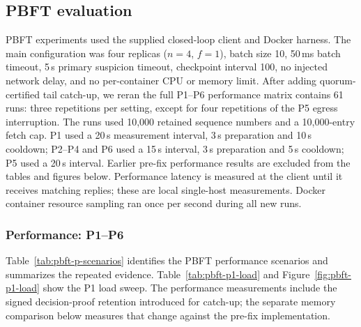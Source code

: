 \documentclass[sigconf,a4paper]{acmart}
\begin{document}
    \subsection{PBFT evaluation}
    \label{subsec:eval-pbft}

    PBFT experiments used the supplied closed-loop client and Docker harness.
    The main configuration was four replicas ($n=4$, $f=1$), batch size 10,
    50\,ms batch timeout, 5\,s primary suspicion timeout, checkpoint interval
    100, no injected network delay, and no per-container CPU or memory limit.
    After adding quorum-certified tail catch-up, we reran the full P1--P6
    performance matrix contains 61 runs: three repetitions per setting,
    except for four repetitions of the P5 egress interruption. The runs used
    10,000 retained sequence numbers and a 10,000-entry fetch cap. P1 used a
    20\,s measurement interval, 3\,s preparation and 10\,s cooldown; P2--P4
    and P6 used a 15\,s interval, 3\,s preparation and 5\,s cooldown; P5 used
    a 20\,s interval. Earlier pre-fix performance results are excluded from
    the tables and figures below. Performance latency is measured at the client
    until it receives matching replies; these are local single-host
    measurements. Docker container resource sampling ran once per second
    during all new runs.

    \subsubsection{Performance: P1--P6}

    Table~\ref{tab:pbft-p-scenarios} identifies the PBFT performance scenarios
    and summarizes the repeated evidence. Table~\ref{tab:pbft-p1-load} and
    Figure~\ref{fig:pbft-p1-load} show the P1 load sweep. The performance
    measurements include the signed decision-proof retention introduced for
    catch-up; the separate memory comparison below measures that change
    against the pre-fix implementation.
\end{document}
